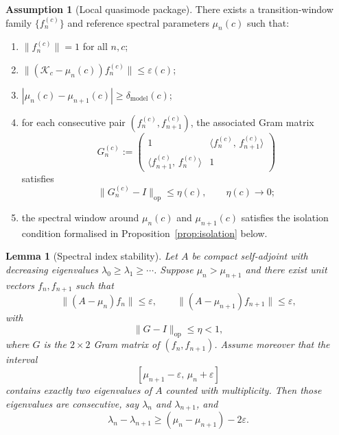 \documentclass[12pt,a4paper]{amsart}
\newtheorem{lemma}[theorem]{Lemma}
\theoremstyle{definition}
\newtheorem{assumption}[theorem]{Assumption}
\theoremstyle{remark}
\newcommand{\norm}[1]{\|#1\|}
\newcommand{\ip}[2]{\langle #1,\, #2\rangle}
\newcommand{\Kc}{\mathcal{K}_c}
\newcommand{\op}{\mathrm{op}}
\begin{document}
\begin{assumption}[Local quasimode package]
\label{ass:quasimode}
There exists a transition-window family $\{f_n^{(c)}\}$ and reference
spectral parameters $\mu_n(c)$ such that:
\begin{enumerate}[\rm(Q1)]
\item\label{Q1}
  $\norm{f_n^{(c)}}=1$ for all $n,c$;
\item\label{Q2}
  $\norm{(\Kc-\mu_n(c))f_n^{(c)}}\le \varepsilon(c)$;
\item\label{Q3}
  $|\mu_n(c)-\mu_{n+1}(c)|\ge \delta_{\mathrm{model}}(c)$;
\item\label{Q4}
  for each consecutive pair $(f_n^{(c)},f_{n+1}^{(c)})$, the associated
  Gram matrix
  \[
    G_n^{(c)} := \begin{pmatrix}
      1 & \ip{f_n^{(c)}}{f_{n+1}^{(c)}} \\
      \ip{f_{n+1}^{(c)}}{f_n^{(c)}} & 1
    \end{pmatrix}
  \]
  satisfies
  \begin{equation}\label{eq:gram-near-id}
    \norm{G_n^{(c)}-I}_{\op} \le \eta(c),
    \qquad \eta(c)\to 0;
  \end{equation}
\item\label{Q5}
  the spectral window around $\mu_n(c)$ and $\mu_{n+1}(c)$ satisfies the
  isolation condition formalised in Proposition~\ref{prop:isolation} below.
\end{enumerate}
\end{assumption}

\begin{lemma}[Spectral index stability]
\label{lem:index}
Let $A$ be compact self-adjoint with decreasing eigenvalues
$\lambda_0\ge\lambda_1\ge\cdots$.
Suppose $\mu_n>\mu_{n+1}$ and there exist unit vectors $f_n,f_{n+1}$ such
that
\[
  \norm{(A-\mu_n)f_n}\le \varepsilon,
  \qquad
  \norm{(A-\mu_{n+1})f_{n+1}}\le \varepsilon,
\]
with
\[
  \norm{G-I}_{\op}\le \eta <1,
\]
where $G$ is the $2\times 2$ Gram matrix of $(f_n,f_{n+1})$.
Assume moreover that the interval
\[
  [\mu_{n+1}-\varepsilon,\,\mu_n+\varepsilon]
\]
contains exactly two eigenvalues of $A$ counted with multiplicity.
Then those eigenvalues are consecutive, say $\lambda_n$ and $\lambda_{n+1}$,
and
\begin{equation}\label{eq:index-gap}
  \lambda_n-\lambda_{n+1}
  \ge (\mu_n-\mu_{n+1}) - 2\varepsilon.
\end{equation}
\end{lemma}
\end{document}
